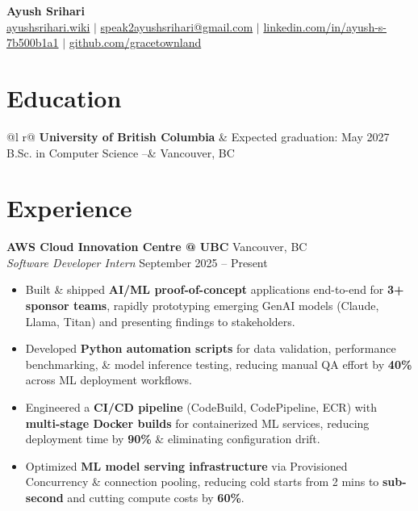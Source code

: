 \pagestyle{empty}

\begin{center}
    {\Huge \textbf{Ayush Srihari}} \\ \vspace{4pt}
    {\small
    \href{https://www.ayushsrihari.wiki/}{ayushsrihari.wiki} $|$ 
    \href{mailto:speak2ayushsrihari@gmail.com}{speak2ayushsrihari@gmail.com} $|$ 
    \href{https://linkedin.com/in/ayush-s-7b500b1a1}{linkedin.com/in/ayush-s-7b500b1a1} $|$ 
    \href{https://github.com/gracetownland}{github.com/gracetownland}
    }
\end{center}

\section{Education}
\begin{tabularx}{\linewidth}{@{}l r@{}}
    \textbf{University of British Columbia} & Expected graduation: May 2027 \\
    B.Sc. in Computer Science --& Vancouver, BC \\
\end{tabularx}

\section{Experience}

\textbf{AWS Cloud Innovation Centre @ UBC} \hfill Vancouver, BC \\
\textit{Software Developer Intern} \hfill September 2025 -- Present
\begin{itemize}[nosep, leftmargin=1.5em, itemsep=2pt]
    \item Built \& shipped \textbf{AI/ML proof-of-concept} applications end-to-end for \textbf{3+ sponsor teams}, rapidly prototyping emerging GenAI models (Claude, Llama, Titan) and presenting findings to stakeholders.
    \item Developed \textbf{Python automation scripts} for data validation, performance benchmarking, \& model inference testing, reducing manual QA effort by \textbf{40\%} across ML deployment workflows.
    \item Engineered a \textbf{CI/CD pipeline} (CodeBuild, CodePipeline, ECR) with \textbf{multi-stage Docker builds} for containerized ML services, reducing deployment time by \textbf{90\%} \& eliminating configuration drift.
    \item Optimized \textbf{ML model serving infrastructure} via Provisioned Concurrency \& connection pooling, reducing cold starts from 2 mins to \textbf{sub-second} and cutting compute costs by \textbf{60\%}.
\end{itemize}

